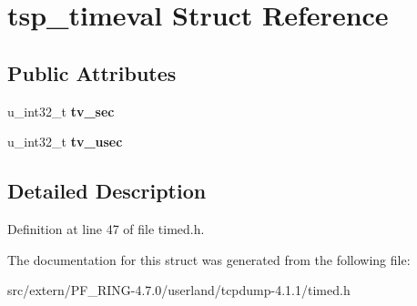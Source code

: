 \hypertarget{structtsp__timeval}{
\section{tsp\_\-timeval Struct Reference}
\label{structtsp__timeval}
}
\subsection*{Public Attributes}
\begin{DoxyCompactItemize}
\item 
\hypertarget{structtsp__timeval_ac3d97e90ff02356580465aaf66311f8f}{
u\_\-int32\_\-t {\bfseries tv\_\-sec}}
\label{structtsp__timeval_ac3d97e90ff02356580465aaf66311f8f}

\item 
\hypertarget{structtsp__timeval_a18cf60324d0a5a5f12aaba9c933c1959}{
u\_\-int32\_\-t {\bfseries tv\_\-usec}}
\label{structtsp__timeval_a18cf60324d0a5a5f12aaba9c933c1959}

\end{DoxyCompactItemize}


\subsection{Detailed Description}


Definition at line 47 of file timed.h.



The documentation for this struct was generated from the following file:\begin{DoxyCompactItemize}
\item 
src/extern/PF\_\-RING-\/4.7.0/userland/tcpdump-\/4.1.1/timed.h\end{DoxyCompactItemize}
